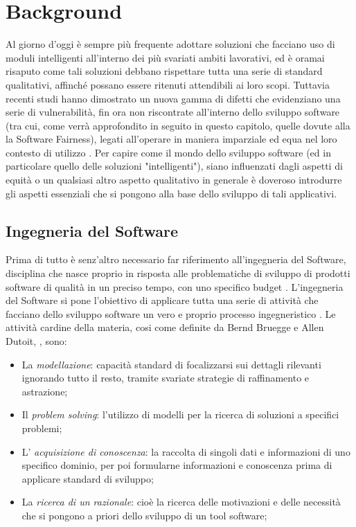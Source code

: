 \chapter{Background} %

Al giorno d'oggi è sempre più frequente adottare soluzioni che facciano uso di moduli intelligenti all'interno dei più svariati ambiti lavorativi, ed è oramai risaputo come tali soluzioni debbano rispettare tutta una serie di standard qualitativi, affinché possano essere ritenuti attendibili ai loro scopi. Tuttavia recenti studi hanno dimostrato un nuova gamma di difetti che evidenziano una serie di vulnerabilità, fin ora non riscontrate all'interno dello sviluppo software (tra cui, come verrà approfondito in seguito in questo capitolo, quelle dovute alla la Software Fairness), legati all'operare in maniera imparziale ed equa nel loro contesto di utilizzo \cite{brun2018software}. Per capire come il mondo dello sviluppo software (ed in particolare quello delle soluzioni "intelligenti"), siano influenzati dagli aspetti di equità o un qualsiasi altro aspetto qualitativo in generale è doveroso introdurre gli aspetti essenziali che si pongono alla base dello sviluppo di tali applicativi.

\section{Ingegneria del Software}
Prima di tutto è senz'altro necessario far riferimento all'ingegneria del Software, disciplina che nasce proprio in risposta alle problematiche di sviluppo di prodotti software di qualità in un preciso tempo, con uno specifico budget \cite{Bruegge2009ObjectOrientedSE}. L'ingegneria del Software si pone l'obiettivo di applicare tutta una serie di attività che facciano dello sviluppo software un vero e proprio processo ingegneristico \cite{mall2018fundamentals}.  Le attività cardine della materia, cosi come definite da Bernd Bruegge e Allen Dutoit, \cite{Bruegge2009ObjectOrientedSE}, sono:

\begin{itemize}
    \item La \emph{modellazione}: capacità standard di focalizzarsi sui dettagli rilevanti ignorando tutto il resto, tramite svariate strategie di raffinamento e astrazione;
    \item Il \emph{problem solving}: l'utilizzo di modelli per la ricerca di soluzioni a specifici problemi;
    \item L' \emph{acquisizione di conoscenza}: la raccolta di singoli dati e informazioni di uno specifico dominio, per poi formularne informazioni e conoscenza prima di applicare standard di sviluppo;
    \item La \emph{ricerca di un razionale}: cioè la ricerca delle motivazioni e delle necessità che si pongono a priori dello sviluppo di un tool software;
\end{itemize}

